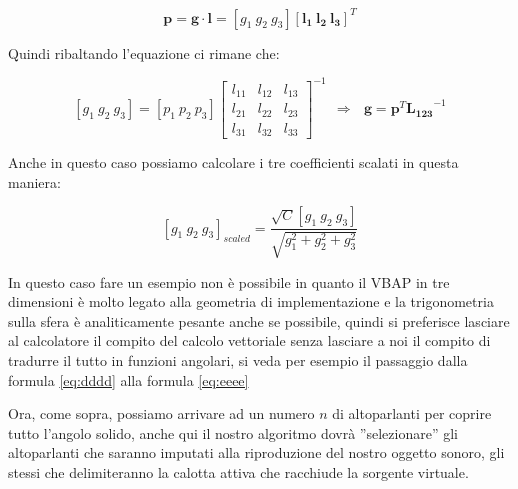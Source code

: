 \documentclass[12pt,a4paper]{report}
\begin{document}
\begin{itemize}
\begin{equation}
\boldsymbol{p} = \boldsymbol{g} \cdot \boldsymbol{l} = \left[ g_1 \ g_2 \ g_3 \right] \left[ \boldsymbol{l_{1}} \ \boldsymbol{l_{2}} \ \boldsymbol{l_{3}} \right]^T
\label{gggg}
\end{equation}

Quindi ribaltando l'equazione ci rimane che:

\begin{equation}
\left[g_1 \ g_2 \ g_3 \right] = \left[ p_1 \ p_2 \ p_3 \right]  {\left[\begin{matrix}
l_{11} & l_{12} & l_{13}\\ l_{21} & l_{22} & l_{23} \\ l_{31} & l_{32} & l_{33}
\end{matrix} \right]}^{-1} \ \ \Rightarrow \ \ \ \boldsymbol{g}=\boldsymbol{p}^T {\boldsymbol{L_{123}}}^{-1}
\label{hhhh}
\end{equation}

Anche in questo caso possiamo calcolare i tre coefficienti scalati in questa maniera:

\begin{equation}
\left[g_1 \ g_2 \ g_3 \right]_{scaled} = \dfrac{\sqrt{C} \left[ g_1 \ g_2 \ g_3 \right]}{\sqrt{g_1^2 + g_2^2 + g_3^2}}
\label{iiii}
\end{equation}

In questo caso fare un esempio non è possibile in quanto il VBAP in tre dimensioni è molto legato alla geometria di implementazione e la trigonometria sulla sfera è analiticamente pesante anche se possibile, quindi si preferisce lasciare al calcolatore il compito del calcolo vettoriale senza lasciare a noi il compito di tradurre il tutto in funzioni angolari, si veda per esempio il passaggio dalla formula \ref{eq:dddd} alla formula \ref{eq:eeee}

Ora, come sopra, possiamo arrivare ad un numero $n$ di altoparlanti per coprire tutto l'angolo solido, anche qui il nostro algoritmo dovrà ''selezionare'' gli altoparlanti che saranno imputati alla riproduzione del nostro oggetto sonoro, gli stessi che delimiteranno la calotta attiva che racchiude la sorgente virtuale.


\end{itemize}
\end{document}
